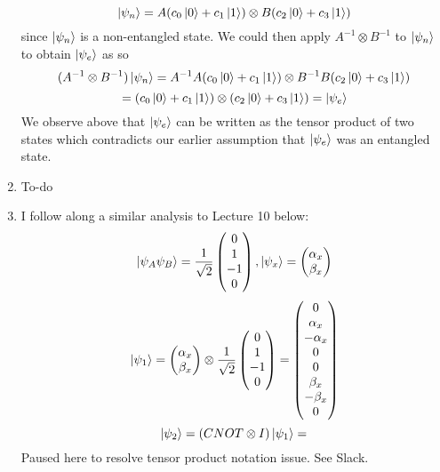 \documentclass[12pt]{article}
\begin{document}
\begin{enumerate}[font=\bfseries]
    \[\ket{\psi_n} = A(c_0\ket{0}+c_1\ket{1}) \otimes B(c_2\ket{0}+c_3\ket{1})\]
    since $\ket{\psi_n}$ is a non-entangled state. We could then apply $A^{-1} \otimes B^{-1}$ to $\ket{\psi_n}$ to obtain $\ket{\psi_e}$ as so
    \[(A^{-1} \otimes B^{-1})\ket{\psi_n} = A^{-1}A(c_0\ket{0}+c_1\ket{1}) \otimes B^{-1}B(c_2\ket{0}+c_3\ket{1})\]
    \[= (c_0\ket{0}+c_1\ket{1}) \otimes (c_2\ket{0}+c_3\ket{1}) = \ket{\psi_e}\]
    We observe above that $\ket{\psi_e}$ can be written as the tensor product of two states which contradicts our earlier assumption that $\ket{\psi_e}$ was an entangled state.
    \item To-do
    \item I follow along a similar analysis to Lecture 10 below:
    \[\ket{\psi_A\psi_B} = 
    \frac{1}{\sqrt{2}}
    \begin{pmatrix}
    0 \\ 1 \\ -1 \\ 0
    \end{pmatrix}
    ,
    \ket{\psi_x} = 
    \begin{pmatrix}
    \alpha_x \\ \beta_x
    \end{pmatrix}
    \]
    \[
    \ket{\psi_1} = \begin{pmatrix}
    \alpha_x \\ \beta_x
    \end{pmatrix}
    \otimes
    \frac{1}{\sqrt{2}}
    \begin{pmatrix}
    0 \\ 1 \\ -1 \\ 0
    \end{pmatrix}
    =
    \begin{pmatrix}
    0 \\ \alpha_x \\ -\alpha_x \\ 0 \\
    0 \\ \beta_x \\ -\beta_x \\ 0
    \end{pmatrix}
    \]
    \[
    \ket{\psi_2} = (CNOT \otimes I)\ket{\psi_1} = 
    \]
    Paused here to resolve tensor product notation issue. See Slack.
\end{enumerate}
\end{document}
